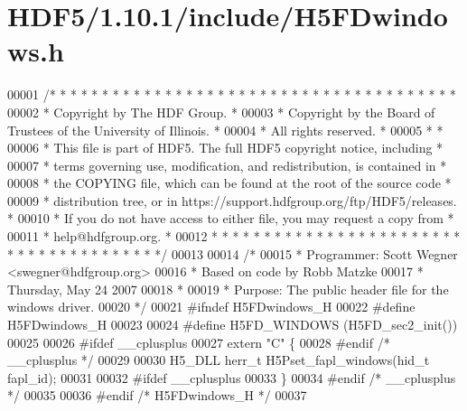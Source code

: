 \hypertarget{_h_d_f5_21_810_81_2include_2_h5_f_dwindows_8h_source}{}\section{H\+D\+F5/1.10.1/include/\+H5\+F\+Dwindows.h}
\label{_h_d_f5_21_810_81_2include_2_h5_f_dwindows_8h_source}

\begin{DoxyCode}
00001 \textcolor{comment}{/* * * * * * * * * * * * * * * * * * * * * * * * * * * * * * * * * * * * * * *}
00002 \textcolor{comment}{ * Copyright by The HDF Group.                                               *}
00003 \textcolor{comment}{ * Copyright by the Board of Trustees of the University of Illinois.         *}
00004 \textcolor{comment}{ * All rights reserved.                                                      *}
00005 \textcolor{comment}{ *                                                                           *}
00006 \textcolor{comment}{ * This file is part of HDF5.  The full HDF5 copyright notice, including     *}
00007 \textcolor{comment}{ * terms governing use, modification, and redistribution, is contained in    *}
00008 \textcolor{comment}{ * the COPYING file, which can be found at the root of the source code       *}
00009 \textcolor{comment}{ * distribution tree, or in https://support.hdfgroup.org/ftp/HDF5/releases.  *}
00010 \textcolor{comment}{ * If you do not have access to either file, you may request a copy from     *}
00011 \textcolor{comment}{ * help@hdfgroup.org.                                                        *}
00012 \textcolor{comment}{ * * * * * * * * * * * * * * * * * * * * * * * * * * * * * * * * * * * * * * */}
00013 
00014 \textcolor{comment}{/*}
00015 \textcolor{comment}{ * Programmer:  Scott Wegner <swegner@hdfgroup.org>}
00016 \textcolor{comment}{ *              Based on code by Robb Matzke}
00017 \textcolor{comment}{ *              Thursday, May 24 2007}
00018 \textcolor{comment}{ *}
00019 \textcolor{comment}{ * Purpose: The public header file for the windows driver.}
00020 \textcolor{comment}{ */}
00021 \textcolor{preprocessor}{#ifndef H5FDwindows\_H}
00022 \textcolor{preprocessor}{#define H5FDwindows\_H}
00023 
00024 \textcolor{preprocessor}{#define H5FD\_WINDOWS    (H5FD\_sec2\_init())}
00025 
00026 \textcolor{preprocessor}{#ifdef \_\_cplusplus}
00027 \textcolor{keyword}{extern} \textcolor{stringliteral}{"C"} \{
00028 \textcolor{preprocessor}{#endif }\textcolor{comment}{/* \_\_cplusplus */}\textcolor{preprocessor}{}
00029 
00030 H5\_DLL herr\_t H5Pset\_fapl\_windows(hid\_t fapl\_id);
00031 
00032 \textcolor{preprocessor}{#ifdef \_\_cplusplus}
00033 \}
00034 \textcolor{preprocessor}{#endif }\textcolor{comment}{/* \_\_cplusplus */}\textcolor{preprocessor}{}
00035 
00036 \textcolor{preprocessor}{#endif }\textcolor{comment}{/* H5FDwindows\_H */}\textcolor{preprocessor}{}
00037 
\end{DoxyCode}
